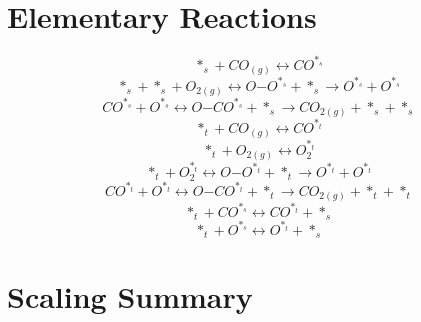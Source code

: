 \documentclass[a4paper,8pt]{report}
\begin{document}
\section{Elementary Reactions}
\begin{equation}
\label{reaction_0}
*_s+CO_{(g)} \leftrightarrow CO^{*_s}
\end{equation}
\begin{equation}
\label{reaction_1}
*_s+*_s+O_{2(g)} \leftrightarrow O\mathrm{-}O^{*_s}+*_s \rightarrow O^{*_s}+O^{*_s}
\end{equation}
\begin{equation}
\label{reaction_2}
CO^{*_s}+O^{*_s} \leftrightarrow O\mathrm{-}CO^{*_s}+*_s \rightarrow CO_{2(g)}+*_s+*_s
\end{equation}
\begin{equation}
\label{reaction_3}
*_t+CO_{(g)} \leftrightarrow CO^{*_t}
\end{equation}
\begin{equation}
\label{reaction_4}
*_t+O_{2(g)} \leftrightarrow O_{2}^{*_t}
\end{equation}
\begin{equation}
\label{reaction_5}
*_t+O_{2}^{*_t} \leftrightarrow O\mathrm{-}O^{*_t}+*_t \rightarrow O^{*_t}+O^{*_t}
\end{equation}
\begin{equation}
\label{reaction_6}
CO^{*_t}+O^{*_t} \leftrightarrow O\mathrm{-}CO^{*_t}+*_t \rightarrow CO_{2(g)}+*_t+*_t
\end{equation}
\begin{equation}
\label{reaction_7}
*_t+CO^{*_s} \leftrightarrow CO^{*_t}+*_s
\end{equation}
\begin{equation}
\label{reaction_8}
*_t+O^{*_s} \leftrightarrow O^{*_t}+*_s
\end{equation}\section{Scaling Summary}
\end{document}
